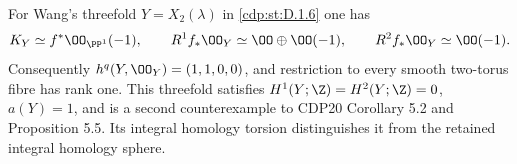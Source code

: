 \begin{proposition}\hypertarget{tag-01FY}{}\label{cdp:st:D.1.13}


For Wang's threefold $Y=X_2(\lambda)$ in \ref{cdp:st:D.1.6} one has
\[
K_Y\simeq f^*\OO_{\PP^1}(-1),\qquad
R^1f_*\OO_Y\simeq\OO\oplus\OO(-1),\qquad
R^2f_*\OO_Y\simeq\OO(-1).
\]
Consequently $h^q(Y,\OO_Y)=(1,1,0,0)$, and restriction to every
smooth two-torus fibre has rank one. This threefold satisfies
$H^1(Y;\Z)=H^2(Y;\Z)=0$, $a(Y)=1$, and is a second
counterexample to CDP20 Corollary 5.2 and Proposition 5.5.
Its integral homology torsion distinguishes it from the retained
integral homology sphere.
\end{proposition}


